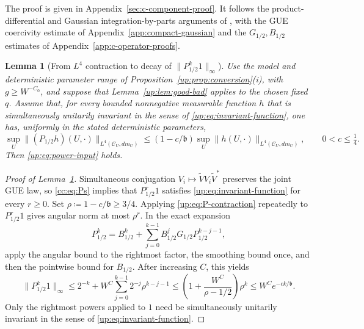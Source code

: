 \documentclass[11pt]{article}
\numberwithin{equation}{section}
\newtheorem{lemma}[theorem]{Lemma}
\theoremstyle{remark}
\begin{document}
The proof is given in Appendix~\ref{sec:c-component-proof}. It follows
the product-differential and Gaussian integration-by-parts arguments of
\cite[Proposition~4.1, Lemma~4.2 and Section~4.3]{Drogin}, with the
GUE coercivity estimate of Appendix~\ref{app:compact-gaussian} and
the $G_{1/2},B_{1/2}$ estimates of
Appendix~\ref{app:c-operator-proofs}.

\begin{lemma}[From $L^4$ contraction to decay of $\|P_{1/2}^k1\|_\infty$]
\label{up:lem:operator-iteration}
Use the model and deterministic parameter range of
Proposition~\ref{up:prop:conversion}\textup{(i)}, with $g\ge W^{-C_0}$, and suppose that
Lemma~\ref{up:lem:good-bad} applies to the chosen fixed $q$.
Assume that, for every bounded nonnegative measurable function $h$
that is simultaneously unitarily invariant in the sense of
\eqref{up:eq:invariant-function},
one has, uniformly in the stated deterministic parameters,
\begin{equation}\label{up:eq:P-contraction}
 \sup_U\|(P_{1/2}h)(U,\cdot)\|_{L^4(\mathcal C_U,dm_U)}
 \le(1-c/\mathfrak b)
       \sup_U\|h(U,\cdot)\|_{L^4(\mathcal C_U,dm_U)},
 \qquad 0<c\le\tfrac14.
\end{equation}
Then \eqref{up:eq:power-input} holds.
\end{lemma}

\begin{proof}[Proof of Lemma~\ref{up:lem:operator-iteration}]
Simultaneous conjugation $V_i\mapsto\widetilde V V_i\widetilde V^*$
preserves the joint GUE law, so \eqref{cc:eq:Ps} implies that
$P_{1/2}^r1$ satisfies \eqref{up:eq:invariant-function} for every $r\ge0$.
Set $\rho\coloneqq1-c/\mathfrak b\ge3/4$.
Applying \eqref{up:eq:P-contraction} repeatedly to $P_{1/2}^r1$ gives
angular norm at most $\rho^r$. In the exact expansion
\begin{equation}\label{cc:eq:firstgood}
 P_{1/2}^k=B_{1/2}^k+
       \sum_{j=0}^{k-1}B_{1/2}^jG_{1/2}P_{1/2}^{k-j-1},
\end{equation}
apply the angular bound to the rightmost factor, the smoothing bound
once, and then the pointwise bound for $B_{1/2}$. After increasing $C$, this yields
\begin{equation}\label{cc:eq:pointwise}
 \|P_{1/2}^k1\|_\infty
 \le2^{-k}+W^C\sum_{j=0}^{k-1}2^{-j}\rho^{k-j-1}
 \le\left(1+\frac{W^C}{\rho-1/2}\right)\rho^k
 \le W^C e^{-ck/\mathfrak b}.
\end{equation}
Only the rightmost powers applied to $1$ need be simultaneously
unitarily invariant in the sense of \eqref{up:eq:invariant-function}.
\end{proof}
\end{document}
